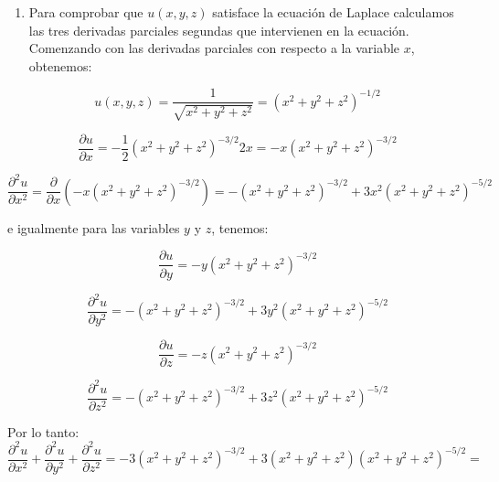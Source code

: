 \documentclass[
  a4paper,
]{scrreport}
\providecommand{\tightlist}{%
  \setlength{\itemsep}{0pt}\setlength{\parskip}{0pt}}\usepackage{longtable,booktabs,array}
\theoremstyle{definition}
\theoremstyle{remark}
\begin{document}
\begin{tcolorbox}[enhanced jigsaw, bottomrule=.15mm, breakable, colframe=quarto-callout-tip-color-frame, toprule=.15mm, opacityback=0, left=2mm, opacitybacktitle=0.6, colback=white, toptitle=1mm, titlerule=0mm, bottomtitle=1mm, arc=.35mm, title=\textcolor{quarto-callout-tip-color}{\faLightbulb}\hspace{0.5em}{Solución}, rightrule=.15mm, colbacktitle=quarto-callout-tip-color!10!white, leftrule=.75mm, coltitle=black]

\begin{enumerate}
\def\labelenumi{\alph{enumi}.}
\tightlist
\item
  Para comprobar que \(u(x,y,z)\) satisface la ecuación de Laplace
  calculamos las tres derivadas parciales segundas que intervienen en la
  ecuación. Comenzando con las derivadas parciales con respecto a la
  variable \(x\), obtenemos:
\end{enumerate}

\[
u(x,y,z) = \frac{1}{{\sqrt {x^2  + y^2  + z^2 } }} = \left( {x^2  +
y^2  + z^2 } \right)^{ - 1/2}
\]

\[
\frac{{\partial u}}{{\partial x}} =  - \frac{1}{2}\left( {x^2  + y^2
+ z^2 } \right)^{ - 3/2} 2x =  - x\left( {x^2  + y^2  + z^2 }
\right)^{ - 3/2}
\]

\[
\frac{{\partial ^2 u}}{{\partial x^2 }} = \frac{\partial }{{\partial
x}}\left( { - x\left( {x^2  + y^2  + z^2 } \right)^{ - 3/2} }
\right) =  - \left( {x^2  + y^2  + z^2 } \right)^{ - 3/2}  + 3x^2
\left( {x^2  + y^2  + z^2 } \right)^{ - 5/2}
\]

e igualmente para las variables \(y\) y \(z\), tenemos:

\[
\frac{{\partial u}}{{\partial y}} =  - y\left( {x^2  + y^2  + z^2 }
\right)^{ - 3/2}
\]

\[
\frac{{\partial ^2 u}}{{\partial y^2 }} =  - \left( {x^2  + y^2  +
z^2 } \right)^{ - 3/2}  + 3y^2 \left( {x^2  + y^2  + z^2 } \right)^{
- 5/2}
\]

\[
\frac{{\partial u}}{{\partial z}} =  - z\left( {x^2  + y^2  + z^2 }
\right)^{ - 3/2}
\]

\[
\frac{{\partial ^2 u}}{{\partial z^2 }} =  - \left( {x^2  + y^2  +
z^2 } \right)^{ - 3/2}  + 3z^2 \left( {x^2  + y^2  + z^2 } \right)^{
- 5/2}
\]

Por lo tanto: \[
\frac{{\partial ^2 u}}{{\partial x^2 }} + \frac{{\partial ^2
u}}{{\partial y^2 }} + \frac{{\partial ^2 u}}{{\partial z^2 }} =  -
3\left( {x^2  + y^2  + z^2 } \right)^{ - 3/2}  + 3\left( {x^2  + y^2
+ z^2 } \right)\left( {x^2  + y^2  + z^2 } \right)^{ - 5/2}  =
\]


\end{tcolorbox}
\end{document}
